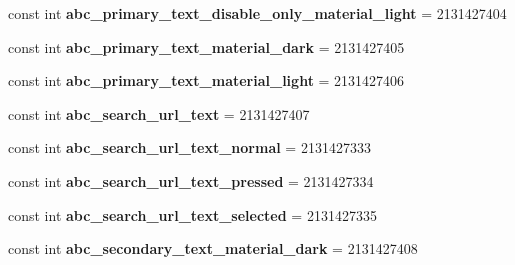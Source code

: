 \begin{DoxyCompactItemize}
const int {\bfseries abc\+\_\+primary\+\_\+text\+\_\+disable\+\_\+only\+\_\+material\+\_\+light} = 2131427404
\item 
\mbox{\label{class_sample_app_1_1_droid_1_1_resource_1_1_color_a9a966baac75ba24a3ae4ea2c68404d7b}} 
const int {\bfseries abc\+\_\+primary\+\_\+text\+\_\+material\+\_\+dark} = 2131427405
\item 
\mbox{\label{class_sample_app_1_1_droid_1_1_resource_1_1_color_a201b5d9e427c53bc2dce14946a8ea385}} 
const int {\bfseries abc\+\_\+primary\+\_\+text\+\_\+material\+\_\+light} = 2131427406
\item 
\mbox{\label{class_sample_app_1_1_droid_1_1_resource_1_1_color_a0be0dc9764a8385896f0a4b58e9840d2}} 
const int {\bfseries abc\+\_\+search\+\_\+url\+\_\+text} = 2131427407
\item 
\mbox{\label{class_sample_app_1_1_droid_1_1_resource_1_1_color_aa438eb8ff8192be69585a3642ddc9152}} 
const int {\bfseries abc\+\_\+search\+\_\+url\+\_\+text\+\_\+normal} = 2131427333
\item 
\mbox{\label{class_sample_app_1_1_droid_1_1_resource_1_1_color_a50b51bd92cecf4690d03d11e8a087510}} 
const int {\bfseries abc\+\_\+search\+\_\+url\+\_\+text\+\_\+pressed} = 2131427334
\item 
\mbox{\label{class_sample_app_1_1_droid_1_1_resource_1_1_color_a91574e8d7fcbe018c9e3153598471afb}} 
const int {\bfseries abc\+\_\+search\+\_\+url\+\_\+text\+\_\+selected} = 2131427335
\item 
\mbox{\label{class_sample_app_1_1_droid_1_1_resource_1_1_color_a5cd507b163b8361940a63adfe6602306}} 
const int {\bfseries abc\+\_\+secondary\+\_\+text\+\_\+material\+\_\+dark} = 2131427408
\item 
\mbox{\label{class_sample_app_1_1_droid_1_1_resource_1_1_color_a905e3d9a8fc3b065d9eb673a171d5d8a}} 

\end{DoxyCompactItemize}
